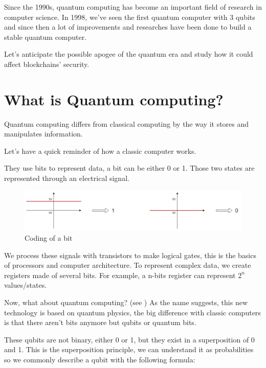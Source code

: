 Since the 1990s, quantum computing has become an important field of research in computer science. In 1998, we've seen the first quantum computer with 3 qubits and since then a lot of improvements and researches have been done to build a stable quantum computer. \newline

Let's anticipate the possible apogee of the quantum era and study how it could affect blockchains' security.

\section{What is Quantum computing?}

Quantum computing differs from classical computing by the way it stores and manipulates information. \newline

Let's have a quick reminder of how a classic computer works. \newline

They use bits to represent data, a bit can be either 0 or 1. Those two states are represented through an electrical signal. \newline

\begin{figure}[ht]
\centering
\includegraphics[width=14cm]{Figures/electricSignals}
\caption{Coding of a bit}
\end{figure}
\medskip

We process these signals with transistors to make logical gates, this is the basics of processors and computer architecture. To represent complex data, we create registers made of several bits. For example, a n-bits register can represent $2^n$ values/states. \newline

Now, what about quantum computing? (see \cite{qubitWiki}) As the name suggests, this new technology is based on quantum physics, the big difference with classic computers is that there aren't bits anymore but qubits or quantum bits. \newline

These qubits are not binary, either 0 or 1, but they exist in a superposition of 0 and 1. This is the superposition principle, we can understand it as probabilities so we commonly describe a qubit with the following formula: \newline

